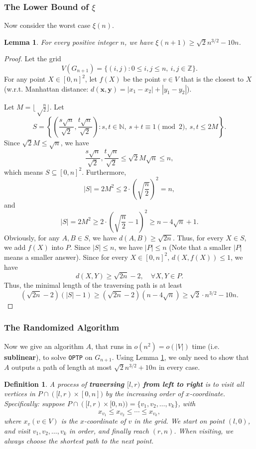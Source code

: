 \documentclass[11pt]{article}
\theoremstyle{plain}
\newtheorem{lemma}{Lemma}[section]
\newtheorem{definition}{Definition}[section]
\begin{document}
\subsubsection{The Lower Bound of \texorpdfstring{$\xi$}{ }}

Now consider the worst case $\xi(n)$. 

\begin{lemma}
\label{hahaha1}
For every positive integer $n$, we have $\xi(n+1)\ge \sqrt{2}n^{3/2}-10n$.
\end{lemma}
\begin{proof}
Let the grid
$$V(G_{n+1})=\{(i,j):0\le i,j\le n,\ i,j\in \mathbb{Z}\}.$$
For any point $X\in [0,n]^2$, let $f(X)$ be the point $v\in V$ that is the closest to $X$ (w.r.t. Manhattan distance: $d(\mathbf{x},\mathbf{y})=|x_1-x_2|+|y_1-y_2|$).

Let $M=\lfloor \sqrt\frac{n}{2}\rfloor$. Let
$$S=\left\{\left(\dfrac{s\sqrt{n}}{\sqrt{2}},\dfrac{t\sqrt{n}}{\sqrt{2}}\right):s,t\in \mathbb{N},\ s+t\equiv 1\pmod 2,\ s,t\le 2M\right\}.$$
Since $\sqrt{2}M\le \sqrt{n}$, we have
$$\dfrac{s\sqrt{n}}{\sqrt{2}},\dfrac{t\sqrt{n}}{\sqrt{2}}\le \sqrt{2}M\sqrt{n}\le n,$$
which means $S\subseteq [0,n]^2$. Furthermore,
$$|S|=2M^2\le 2\cdot \left(\sqrt{\dfrac{n}{2}}\right)^2=n,$$
and
$$|S|=2M^2\ge 2\cdot \left(\sqrt{\dfrac{n}{2}}-1\right)^2\ge n-4\sqrt{n}+1.$$
Obviously, for any $A,B\in S$, we have $d(A,B)\ge \sqrt{2n}$. Thus, for every $X\in S$, we add $f(X)$ into $P$. Since $|S|\le n$, we have $|P|\le n$ (Note that a smaller $|P|$ means a smaller answer). Since for every $X\in [0,n]^2$, $d(X,f(X))\le 1$, we have
$$d(X,Y)\ge \sqrt{2n}-2,\quad \forall X,Y\in P.$$
Thus, the minimal length of the traversing path is at least
$$(\sqrt{2n}-2)(|S|-1)\ge (\sqrt{2n}-2)(n-4\sqrt{n})\ge \sqrt{2}\cdot n^{3/2}-10n.$$
\end{proof}

\subsubsection{The Randomized Algorithm}

Now we give an algorithm $A$, that runs in $o(n^2)=o(|V|)$ time (i.e. \textbf{sublinear}), to solve \texttt{OPTP} on $G_{n+1}$. Using Lemma \ref{hahaha1}, we only need to show that $A$ outputs a path of length at most $\sqrt{2}n^{3/2}+10n$ in every case.

\begin{definition}
    \label{def5.1}
A process of \textbf{traversing $[l,r)$ from left to right} is to visit all vertices in $P\cap ([l,r)\times [0,n])$ by the increasing order of $x$-coordinate. Specifically: suppose $P\cap ([l,r)\times [0,n))=\{v_1,v_2,\ldots,v_k\}$, with
$$x_{v_1}\le x_{v_2}\le \cdots\le x_{v_k},$$
where $x_{v}(v\in V)$ is the $x$-coordinate of $v$ in the grid. We start on point $(l,0)$, and visit $v_1,v_2,\ldots,v_k$ in order, and finally reach $(r,n)$. When visiting, we always choose the shortest path to the next point.
\end{definition}
\end{document}

